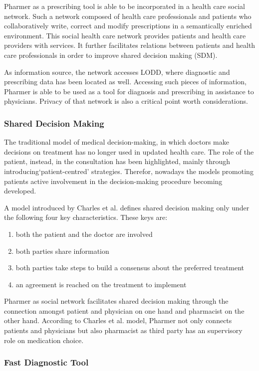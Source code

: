 \documentclass[journal]{IEEEtran}
\begin{document}
Pharmer as a prescribing tool is able to be incorporated in a health care social network.
Such a network composed of health care professionals and patients who collaboratively write, correct and modify prescriptions in a semantically enriched environment.
This social health care network provides patients and health care providers with services.
It further facilitates relations between patients and health care professionals in order to improve shared decision making (SDM).

As information source, the network accesses LODD, where diagnostic and prescribing data has been located as well.
Accessing such pieces of information, Pharmer is able to be used as a tool for diagnosis and prescribing in assistance to physicians.
Privacy of that network is also a critical point worth considerations.

\subsubsection{Shared Decision Making}
\label{subsec: SDM}
 The traditional model of medical decision-making, in which doctors make decisions on treatment has no longer used in updated health care.
 The role of the patient, instead, in the consultation has been highlighted, mainly through introducing‘patient-centred’ strategies.
 Therefor, nowadays the models promoting patients active involvement in the decision-making procedure becoming developed.
 
 A model introduced by Charles et al. defines shared decision making only under the following four key characteristics.
 These keys are:
 \begin{enumerate}
   \item both the patient and the doctor are involved
   \item both parties share information
   \item both parties take steps to build a consensus about the preferred treatment
   \item an agreement is reached on the treatment to implement
 \end{enumerate}

Pharmer as social network facilitates shared decision making through the connection amongst patient and physician on one hand and pharmacist on the other hand. According to Charles et al. model, Pharmer not only connects patients and physicians but also pharmacist as third party has an supervisory role on medication choice.

\subsubsection{Fast Diagnostic Tool}
\end{document}
